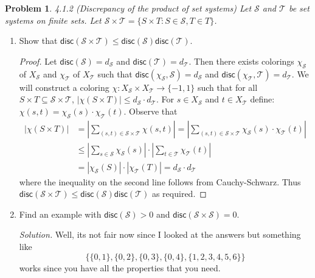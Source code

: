 \documentclass[11pt]{article}
\newcommand\disc{\mathsf{disc}}
\newcommand\SSet{\mathcal{S}}
\newcommand\T{\mathcal{T}}
\newtheorem{problem}{Problem}
\begin{document}
\begin{problem}
4.1.2 (Discrepancy of the product of set systems) Let $\SSet$ and $\T$ be set systems on finite sets. Let $\SSet \times \T = \{S \times T: S \in \SSet, T \in T\}$.
\end{problem}
\begin{enumerate}
\item Show that $\disc(\SSet \times \T) \leq \disc(\SSet)\disc(\T)$.
\begin{proof}
Let $\disc(\SSet) = d_{\SSet}$ and $\disc(\T) = d_{\T}$. Then there exists colorings $\chi_{\SSet}$ of $X_{\SSet}$ and $\chi_{\T}$ of $X_{\T}$ such that $\disc(\chi_{\SSet}, \SSet) = d_{\SSet}$ and $\disc(\chi_{\T}, \T) = d_{\T}$. We will construct a coloring $\chi: X_{\SSet} \times X_{\T} \rightarrow \{-1, 1\}$ such that for all $S \times T \subseteq \SSet \times \T$, $|\chi(S \times T)| \leq d_{\SSet} \cdot d_{\T}$. For $s \in X_{\SSet}$ and $t \in X_{\T}$ define: $\chi(s, t) = \chi_{\SSet}(s) \cdot \chi_{\T}(t)$. Observe that
\begin{align*}
|\chi(S \times T)| &=  \left| \sum_{(s,t) \in \SSet \times \T} \chi(s, t) \right| = \left| \sum_{(s,t) \in \SSet \times \T}\chi_{\SSet}(s) \cdot \chi_{\T}(t)\right| \\
&\leq \left| \sum_{s \in \SSet} \chi_{\SSet}(s)\right| \cdot \left| \sum_{t\in\T} \chi_{\T}(t) \right| \\
&= |\chi_{\SSet}(S)|\cdot|\chi_{\T}(T)| = d_{\SSet}\cdot d_{\T}
\end{align*}
where the inequality on the second line follows from Cauchy-Schwarz. Thus $\disc(\SSet \times \T) \leq \disc(\SSet)\disc(\T)$ as required.
\end{proof}
\item Find an example with $\disc(\SSet) > 0$ and $\disc(\SSet \times \SSet) = 0$. 

\emph{Solution.} Well, its not fair now since I looked at the answers but something like 
\[\{\{0,1\},\{0,2\},\{0,3\},\{0,4\}, \{1,2,3,4,5,6\}\}\] works since you have all the properties that you need.
\end{enumerate}


\begin{comment}
\begin{problem}
4.2.4 Let $A = \frac{1}{2}(H + J)$ be the incidence matrix of set system $\SSet$. Show that the eigenvalue bound is quite weak for $A$, namely that the smallest eigenvalue of $A^TA$ is $O(1)$
\end{problem}
\begin{proof}

\end{proof}


\begin{problem}
4.3.2 Find a set system $(X, \SSet)$ and a set $A \subset X$ such that $\disc(\SSet) = 0$ but $\disc(S \cup \{A\})$ is arbitrarily large.
\end{problem}
\emph{Solution.}
\end{comment}
\end{document}
